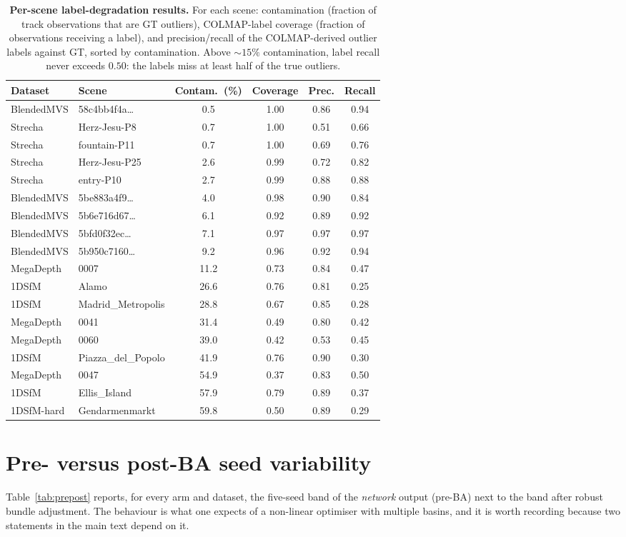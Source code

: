 \documentclass[10pt,twocolumn,letterpaper]{article}
\begin{document}
\begin{table}[t]\centering\footnotesize
\caption{\textbf{Per-scene label-degradation results.} For each scene: contamination (fraction of track observations that are GT outliers), COLMAP-label coverage (fraction of observations receiving a label), and precision/recall of the COLMAP-derived outlier labels against GT, sorted by contamination. Above ${\sim}15\%$ contamination, label recall never exceeds $0.50$: the labels miss at least half of the true outliers.}
\label{tab:supp_labelceiling}
\setlength{\tabcolsep}{3.5pt}%
\begin{tabular}{llcccc}
\toprule
Dataset & Scene & Contam.\ (\%) & Coverage & Prec. & Recall\\
\midrule
BlendedMVS & 58c4bb4f4a\ldots & 0.5 & 1.00 & 0.86 & 0.94\\
Strecha & Herz-Jesu-P8 & 0.7 & 1.00 & 0.51 & 0.66\\
Strecha & fountain-P11 & 0.7 & 1.00 & 0.69 & 0.76\\
Strecha & Herz-Jesu-P25 & 2.6 & 0.99 & 0.72 & 0.82\\
Strecha & entry-P10 & 2.7 & 0.99 & 0.88 & 0.88\\
BlendedMVS & 5be883a4f9\ldots & 4.0 & 0.98 & 0.90 & 0.84\\
BlendedMVS & 5b6e716d67\ldots & 6.1 & 0.92 & 0.89 & 0.92\\
BlendedMVS & 5bfd0f32ec\ldots & 7.1 & 0.97 & 0.97 & 0.97\\
BlendedMVS & 5b950c7160\ldots & 9.2 & 0.96 & 0.92 & 0.94\\
MegaDepth & 0007 & 11.2 & 0.73 & 0.84 & 0.47\\
1DSfM & Alamo & 26.6 & 0.76 & 0.81 & 0.25\\
1DSfM & Madrid\_Metropolis & 28.8 & 0.67 & 0.85 & 0.28\\
MegaDepth & 0041 & 31.4 & 0.49 & 0.80 & 0.42\\
MegaDepth & 0060 & 39.0 & 0.42 & 0.53 & 0.45\\
1DSfM & Piazza\_del\_Popolo & 41.9 & 0.76 & 0.90 & 0.30\\
MegaDepth & 0047 & 54.9 & 0.37 & 0.83 & 0.50\\
1DSfM & Ellis\_Island & 57.9 & 0.79 & 0.89 & 0.37\\
1DSfM-hard & Gendarmenmarkt & 59.8 & 0.50 & 0.89 & 0.29\\
\bottomrule
\end{tabular}
\end{table}


\section{Pre- versus post-BA seed variability}\label{app:prepost}
Table~\ref{tab:prepost} reports, for every arm and dataset, the five-seed band of the
\emph{network} output (pre-BA) next to the band after robust bundle adjustment. The
behaviour is what one expects of a non-linear optimiser with multiple basins, and it is
worth recording because two statements in the main text depend on it.
\end{document}
